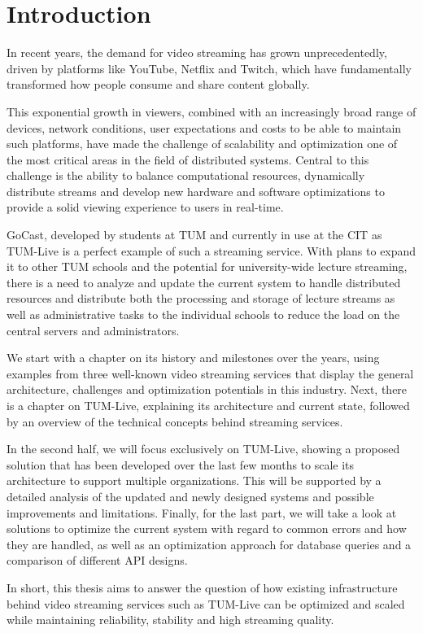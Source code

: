 
\chapter{Introduction}\label{chapter:introduction}

In recent years, the demand for video streaming has grown unprecedentedly, driven by platforms like YouTube, Netflix and Twitch, which have fundamentally transformed how people consume and share content globally.

This exponential growth in viewers, combined with an increasingly broad range of devices, network conditions, user expectations and costs to be able to maintain such platforms, have made the challenge of scalability and optimization one of the most critical areas in the field of distributed systems. Central to this challenge is the ability to balance computational resources, dynamically distribute streams and develop new hardware and software optimizations to provide a solid viewing experience to users in real-time.

GoCast, developed by students at \ac{TUM} and currently in use at the \ac{CIT} as TUM-Live is a perfect example of such a streaming service. With plans to expand it to other \ac{TUM} schools and the potential for university-wide lecture streaming, there is a need to analyze and update the current system to handle distributed resources and distribute both the processing and storage of lecture streams as well as administrative tasks to the individual schools to reduce the load on the central servers and administrators.

We start with a chapter on its history and milestones over the years, using examples from three well-known video streaming services that display the general architecture, challenges and optimization potentials in this industry. Next, there is a chapter on TUM-Live, explaining its architecture and current state, followed by an overview of the technical concepts behind streaming services.  

In the second half, we will focus exclusively on TUM-Live, showing a proposed solution that has been developed over the last few months to scale its architecture to support multiple organizations. This will be supported by a detailed analysis of the updated and newly designed systems and possible improvements and limitations. Finally, for the last part, we will take a look at solutions to optimize the current system with regard to common errors and how they are handled, as well as an optimization approach for database queries and a comparison of different \ac{API} designs.    

In short, this thesis aims to answer the question of how existing infrastructure behind video streaming services such as TUM-Live can be optimized and scaled while maintaining reliability, stability and high streaming quality.